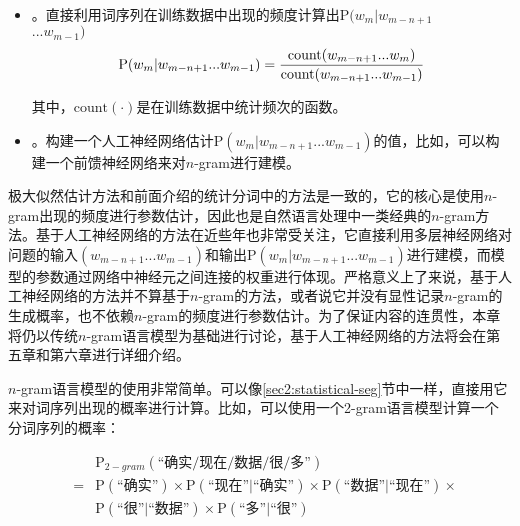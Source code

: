 \begin{itemize}
\vspace{0.5em}
\item {\small{}}。直接利用词序列在训练数据中出现的频度计算出$\textrm{P}(w_m|w_{m-n+1}$\\$... w_{m-1})$
\begin{eqnarray}
\textrm{P}(w_m|w_{m-n+1}...w_{m-1})=\frac{\textrm{count}(w_{m-n+1}...w_m)}{\textrm{count}(w_{m-n+1}...w_{m-1})}
\label{eq:2-24}
\vspace{0.5em}
\end{eqnarray}

其中，$\textrm{count}(\cdot)$是在训练数据中统计频次的函数。

\vspace{0.5em}
\item {\small{}}。构建一个人工神经网络估计$\textrm{P}(w_m|w_{m-n+1} ... w_{m-1})$的值，比如，可以构建一个前馈神经网络来对$n$-gram进行建模。
\end{itemize}
\vspace{0.5em}

\parinterval 极大似然估计方法和前面介绍的统计分词中的方法是一致的，它的核心是使用$n$-gram出现的频度进行参数估计，因此也是自然语言处理中一类经典的$n$-gram方法。基于人工神经网络的方法在近些年也非常受关注，它直接利用多层神经网络对问题的输入$(w_{m-n+1}...w_{m-1})$和输出$\textrm{P}(w_m|w_{m-n+1} ... w_{m-1})$进行建模，而模型的参数通过网络中神经元之间连接的权重进行体现。严格意义上了来说，基于人工神经网络的方法并不算基于$n$-gram的方法，或者说它并没有显性记录$n$-gram的生成概率，也不依赖$n$-gram的频度进行参数估计。为了保证内容的连贯性，本章将仍以传统$n$-gram语言模型为基础进行讨论，基于人工神经网络的方法将会在第五章和第六章进行详细介绍。

\parinterval $n$-gram语言模型的使用非常简单。可以像\ref{sec2:statistical-seg}节中一样，直接用它来对词序列出现的概率进行计算。比如，可以使用一个2-gram语言模型计算一个分词序列的概率：

\begin{eqnarray}
 & &\textrm{P}_{2-gram}{(\textrm{``确实}/\textrm{现在}/\textrm{数据}/\textrm{很}/\textrm{多''})} \nonumber \\
&= & \textrm{P}(\textrm{``确实''}) \times\textrm{P}(\textrm{``现在''}|\textrm{``确实''})\times\textrm{P}(\textrm{``数据''}|\textrm{``现在''}) \times \nonumber \\
&  & \textrm{P}(\textrm{``很''}|\textrm{``数据''})\times\textrm{P}(\textrm{``多''}|\textrm{``很''})
\label{eq:2-25}
\end{eqnarray}

